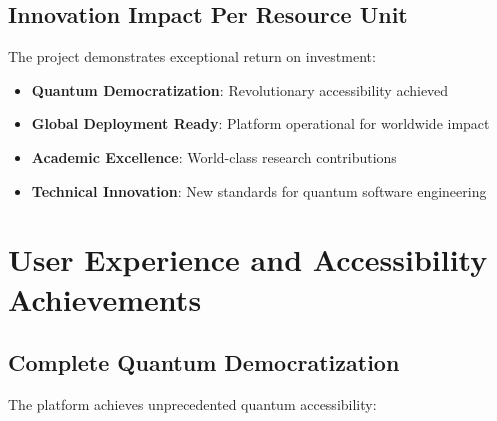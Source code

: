 \documentclass[12pt,a4paper]{article}
\begin{document}
\subsection{Innovation Impact Per Resource Unit}

The project demonstrates exceptional return on investment:
\begin{itemize}
    \item \textbf{Quantum Democratization}: Revolutionary accessibility achieved
    \item \textbf{Global Deployment Ready}: Platform operational for worldwide impact
    \item \textbf{Academic Excellence}: World-class research contributions
    \item \textbf{Technical Innovation}: New standards for quantum software engineering
\end{itemize}

\section{User Experience and Accessibility Achievements}

\subsection{Complete Quantum Democratization}

The platform achieves unprecedented quantum accessibility:
\end{document}
